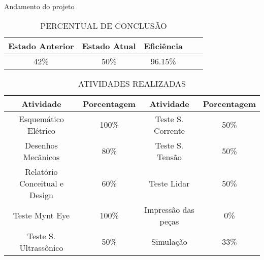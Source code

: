   \begin{frame}[c]{Andamento do projeto}
    \begin{table}[ht!]
    \centering
        \caption{PERCENTUAL DE CONCLUSÃO}
        \begin{tabular}{|c|c|c|c|c|} \hline
            \textbf{Estado Anterior}&\textbf{Estado Atual}&\textbf{Eficiência}\\\hline
            42\% &50\% &96.15\% \\ \hline
        \end{tabular}
    \end{table}
    \begin{table}[ht!]
            \caption{ATIVIDADES REALIZADAS}
            \begin{tabular}{|c|c|c|c|} \hline
                \textbf{Atividade}&\textbf{Porcentagem}&\textbf{Atividade}&\textbf{Porcentagem}\\\hline
                Esquemático Elétrico &100\% &  Teste S. Corrente  &50\% \\ \hline
                Desenhos Mecânicos   &80\% &   Teste S. Tensão    &50\% \\ \hline
                Relatório Conceitual e Design  &60\% &   Teste Lidar        &50\% \\ \hline
                Teste Mynt Eye       &100\% &  Impressão das peças &0\% \\ \hline
                Teste S. Ultrassônico&50\% &   Simulação           &33\% \\ \hline
            \end{tabular}
        \end{table}
\end{frame}


